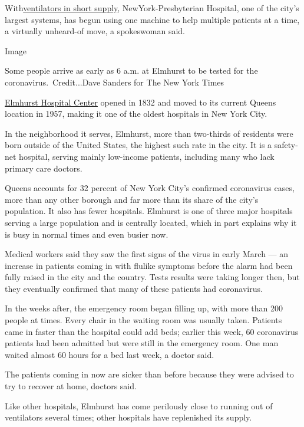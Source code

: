 With\href{https://www.nytimes3xbfgragh.onion/video/us/politics/100000007051271/cuomo-coronavirus-update.html}{ventilators
in short supply}, NewYork-Presbyterian Hospital, one of the city's
largest systems, has begun using one machine to help multiple patients
at a time, a virtually unheard-of move, a spokeswoman said.

Image

Some people arrive as early as 6 a.m. at Elmhurst to be tested for the
coronavirus.~Credit...Dave Sanders for The New York Times

\href{https://www.nychealthandhospitals.org/wp-content/uploads/2016/07/chna-elmhurst-2013.pdf}{Elmhurst
Hospital Center} opened in 1832 and moved to its current Queens location
in 1957, making it one of the oldest hospitals in New York City.

In the neighborhood it serves, Elmhurst, more than two-thirds of
residents were born outside of the United States, the highest such rate
in the city. It is a safety-net hospital, serving mainly low-income
patients, including many who lack primary care doctors.

Queens accounts for 32 percent of New York City's confirmed coronavirus
cases, more than any other borough and far more than its share of the
city's population. It also has fewer hospitals. Elmhurst is one of three
major hospitals serving a large population and is centrally located,
which in part explains why it is busy in normal times and even busier
now.

Medical workers said they saw the first signs of the virus in early
March --- an increase in patients coming in with flulike symptoms before
the alarm had been fully raised in the city and the country. Tests
results were taking longer then, but they eventually confirmed that many
of these patients had coronavirus.

In the weeks after, the emergency room began filling up, with more than
200 people at times. Every chair in the waiting room was usually taken.
Patients came in faster than the hospital could add beds; earlier this
week, 60 coronavirus patients had been admitted but were still in the
emergency room. One man waited almost 60 hours for a bed last week, a
doctor said.

The patients coming in now are sicker than before because they were
advised to try to recover at home, doctors said.

Like other hospitals, Elmhurst has come perilously close to running out
of ventilators several times; other hospitals have replenished its
supply.

